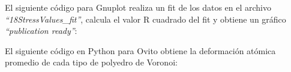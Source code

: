 El siguiente código para Gnuplot realiza un fit de los datos en el archivo \textit{``18StressValues\_fit''}, calcula el valor R cuadrado del fit y obtiene un gráfico \textit{``publication ready''}:



El siguiente código en Python para Ovito obtiene la deformación atómica promedio de cada tipo de polyedro de Voronoi:

